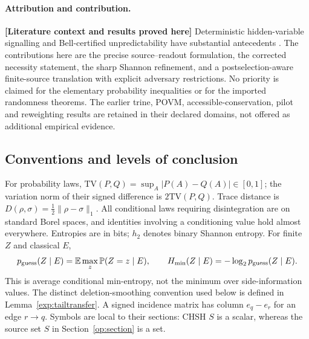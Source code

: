 \documentclass[11pt,a4paper]{article}
\theoremstyle{definition}
\theoremstyle{remark}\newtheorem{remark}[theorem]{Remark}
\newcommand{\status}[1]{\textbf{[#1]}\quad}
\newcommand{\TV}{\mathrm{TV}}
\newcommand{\Prb}{\mathbb P}
\newcommand{\E}{\mathbb E}
\begin{document}
\paragraph{Attribution and contribution.}
\status{Literature context and results proved here}
Deterministic hidden-variable signalling and Bell-certified unpredictability have substantial antecedents \cite{V02,CR11,Pironio10}. The contributions here are the precise source--readout formulation, the corrected necessity statement, the sharp Shannon refinement, and a postselection-aware finite-source translation with explicit adversary restrictions. No priority is claimed for the elementary probability inequalities or for the imported randomness theorems. The earlier trine, POVM, accessible-conservation, pilot and reweighting results are retained in their declared domains, not offered as additional empirical evidence.

\subsection{Conventions and levels of conclusion}
For probability laws, $\TV(P,Q)=\sup_A|P(A)-Q(A)|\in[0,1]$; the variation norm of their signed difference is $2\TV(P,Q)$. Trace distance is $D(\rho,\sigma)=\frac12\|\rho-\sigma\|_1$. All conditional laws requiring disintegration are on standard Borel spaces, and identities involving a conditioning value hold almost everywhere. Entropies are in bits; $h_2$ denotes binary Shannon entropy. For finite $Z$ and classical $E$,
\[
 p_{\rm guess}(Z\mid E)=\E\max_z\Prb(Z=z\mid E),\qquad
 H_{\min}(Z\mid E)=-\log_2 p_{\rm guess}(Z\mid E).
\]
This is average conditional min-entropy, not the minimum over side-information values. The distinct deletion-smoothing convention used below is defined in Lemma~\ref{exp:tailtransfer}. A signed incidence matrix has column $e_q-e_r$ for an edge $r\to q$. Symbols are local to their sections: CHSH $S$ is a scalar, whereas the source set $S$ in Section~\ref{op:section} is a set.
\end{document}
